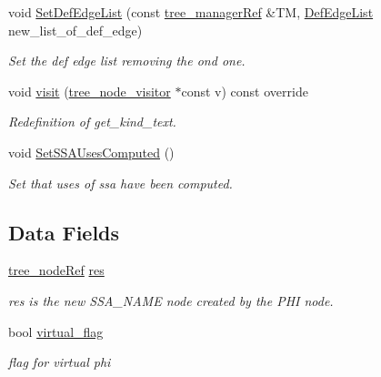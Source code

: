 \begin{DoxyCompactItemize}
void \hyperlink{structgimple__phi_af08224f0a0aa3f652c61fccd307e5680}{Set\+Def\+Edge\+List} (const \hyperlink{tree__manager_8hpp_a96ff150c071ce11a9a7a1e40590f205e}{tree\+\_\+manager\+Ref} \&TM, \hyperlink{structgimple__phi_abaf4e51c9be92bf7efbf5aaaab82f386}{Def\+Edge\+List} new\+\_\+list\+\_\+of\+\_\+def\+\_\+edge)
\begin{DoxyCompactList}\small\item\em Set the def edge list removing the ond one. \end{DoxyCompactList}\item 
void \hyperlink{structgimple__phi_a833830c256d428292a6d38e32cb7eabd}{visit} (\hyperlink{classtree__node__visitor}{tree\+\_\+node\+\_\+visitor} $\ast$const v) const override
\begin{DoxyCompactList}\small\item\em Redefinition of get\+\_\+kind\+\_\+text. \end{DoxyCompactList}\item 
void \hyperlink{structgimple__phi_ad5b4f948b0c3e9d930b329e7b7e9870d}{Set\+S\+S\+A\+Uses\+Computed} ()
\begin{DoxyCompactList}\small\item\em Set that uses of ssa have been computed. \end{DoxyCompactList}\end{DoxyCompactItemize}
\subsection*{Data Fields}
\begin{DoxyCompactItemize}
\item 
\hyperlink{tree__node_8hpp_a6ee377554d1c4871ad66a337eaa67fd5}{tree\+\_\+node\+Ref} \hyperlink{structgimple__phi_a6b3ee3b0f107f7b738121116aae06fc0}{res}
\begin{DoxyCompactList}\small\item\em res is the new S\+S\+A\+\_\+\+N\+A\+ME node created by the P\+HI node. \end{DoxyCompactList}\item 
bool \hyperlink{structgimple__phi_a57b24c6fdd3c1cb83ba51060a669cdd0}{virtual\+\_\+flag}
\begin{DoxyCompactList}\small\item\em flag for virtual phi \end{DoxyCompactList}\end{DoxyCompactItemize}
